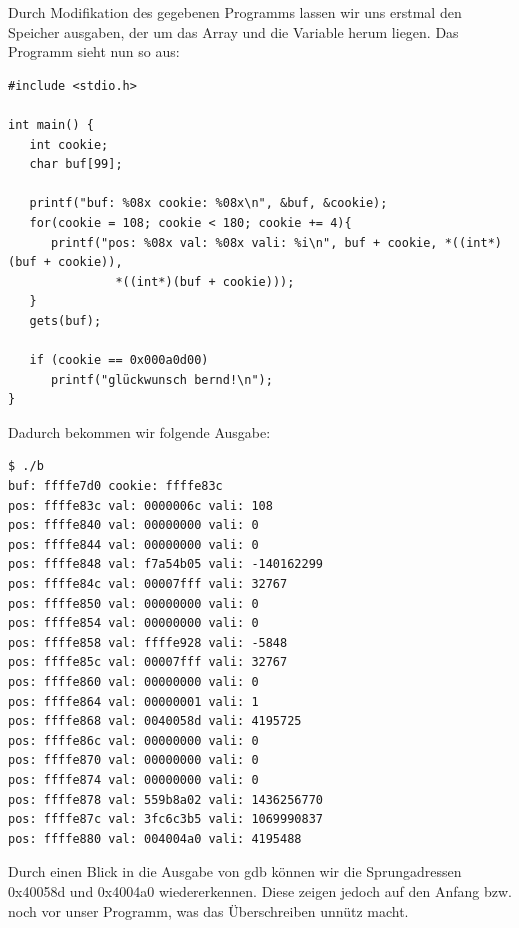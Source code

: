 \documentclass[10pt,a4paper]{article}
\begin{document}
Durch Modifikation des gegebenen Programms lassen wir uns erstmal den Speicher ausgaben, der um das Array und die Variable herum liegen. Das Programm sieht nun so aus:
\begin{verbatim}
#include <stdio.h>

int main() {
   int cookie;
   char buf[99];

   printf("buf: %08x cookie: %08x\n", &buf, &cookie);
   for(cookie = 108; cookie < 180; cookie += 4){
      printf("pos: %08x val: %08x vali: %i\n", buf + cookie, *((int*)(buf + cookie)),
               *((int*)(buf + cookie)));
   }
   gets(buf);

   if (cookie == 0x000a0d00)
      printf("glückwunsch bernd!\n");
}
\end{verbatim}

Dadurch bekommen wir folgende Ausgabe:
\begin{verbatim}
$ ./b
buf: ffffe7d0 cookie: ffffe83c
pos: ffffe83c val: 0000006c vali: 108
pos: ffffe840 val: 00000000 vali: 0
pos: ffffe844 val: 00000000 vali: 0
pos: ffffe848 val: f7a54b05 vali: -140162299
pos: ffffe84c val: 00007fff vali: 32767
pos: ffffe850 val: 00000000 vali: 0
pos: ffffe854 val: 00000000 vali: 0
pos: ffffe858 val: ffffe928 vali: -5848
pos: ffffe85c val: 00007fff vali: 32767
pos: ffffe860 val: 00000000 vali: 0
pos: ffffe864 val: 00000001 vali: 1
pos: ffffe868 val: 0040058d vali: 4195725
pos: ffffe86c val: 00000000 vali: 0
pos: ffffe870 val: 00000000 vali: 0
pos: ffffe874 val: 00000000 vali: 0
pos: ffffe878 val: 559b8a02 vali: 1436256770
pos: ffffe87c val: 3fc6c3b5 vali: 1069990837
pos: ffffe880 val: 004004a0 vali: 4195488
\end{verbatim}

Durch einen Blick in die Ausgabe von gdb können wir die Sprungadressen 0x40058d und 0x4004a0 wiedererkennen. Diese zeigen jedoch auf den Anfang bzw. noch vor unser Programm, was das Überschreiben unnütz macht.
\end{document}
